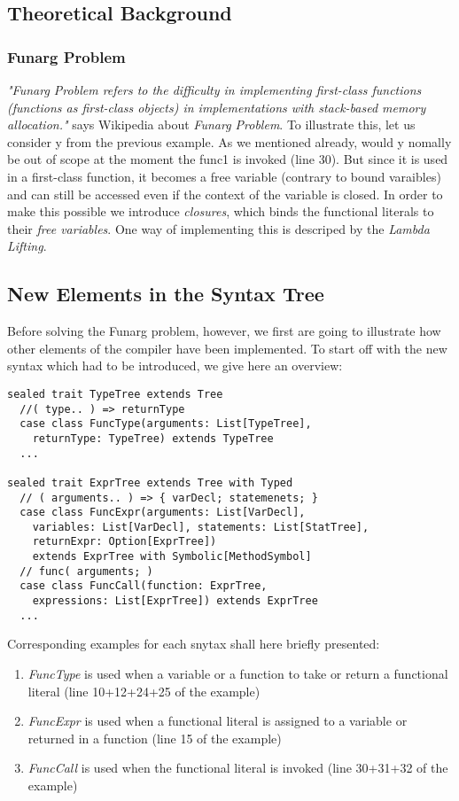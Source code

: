 \subsection{Theoretical Background}

\subsubsection{Funarg Problem}
\emph{"Funarg Problem refers to the difficulty in implementing first-class functions (functions as first-class objects) in implementations with stack-based memory allocation."} says Wikipedia about \emph{Funarg Problem}.  To illustrate this, let us consider y from the previous example. As we mentioned already, would y nomally be out of scope at the moment the func1 is invoked (line 30). But since it is used in a first-class function, it becomes a free variable (contrary to bound varaibles) and can still be accessed even if the context of the variable is closed. In order to make this possible we introduce \emph{closures}, which binds the functional literals to their \emph{free variables}. One way of implementing this is descriped by the \emph{Lambda Lifting}. \newline

\subsection{New Elements in the Syntax Tree}
Before solving the Funarg problem, however, we first are going to illustrate how other elements of the compiler have been implemented. To start off with the new syntax which had to be introduced, we give here an overview:

\begin{lstlisting}
sealed trait TypeTree extends Tree
  //( type.. ) => returnType
  case class FuncType(arguments: List[TypeTree],
    returnType: TypeTree) extends TypeTree
  ...

sealed trait ExprTree extends Tree with Typed
  // ( arguments.. ) => { varDecl; statemenets; }
  case class FuncExpr(arguments: List[VarDecl],
    variables: List[VarDecl], statements: List[StatTree],
    returnExpr: Option[ExprTree])
    extends ExprTree with Symbolic[MethodSymbol]
  // func( arguments; )
  case class FuncCall(function: ExprTree,
    expressions: List[ExprTree]) extends ExprTree
  ...
\end{lstlisting}

Corresponding examples for each snytax shall here briefly presented:
\begin{enumerate}
\item \emph{FuncType} is used when a variable or a function to take or return a functional literal (line 10+12+24+25 of the example)
\item \emph{FuncExpr} is used when a functional literal is assigned to a variable or returned in a function (line 15 of the example)
\item \emph{FuncCall} is used when the functional literal is invoked (line 30+31+32 of the example)
\end{enumerate}

